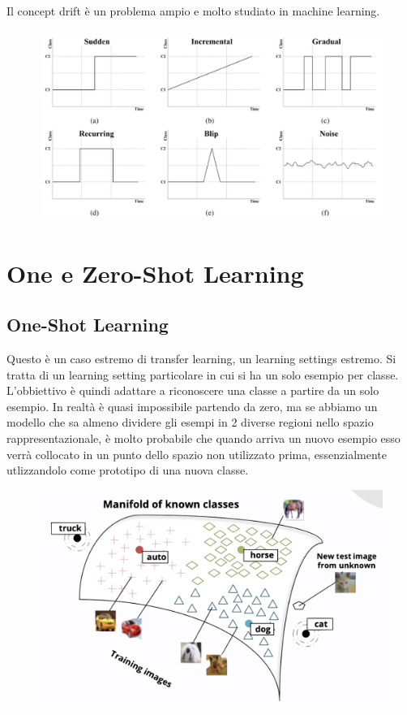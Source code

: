 Il concept drift è un problema ampio e molto studiato in machine learning.
\begin{figure}[!h]
  \includegraphics[scale=.5]{images/representation_learning/concept_drift.png}
  \centering
\end{figure}
\newpage
\section{One e Zero-Shot Learning}
\subsection{One-Shot Learning}
Questo è un caso estremo di transfer learning, un learning settings estremo. Si tratta di un learning setting 
particolare in cui si ha un solo esempio per classe. L'obbiettivo è quindi adattare a riconoscere una classe 
a partire da un solo esempio. In realtà è quasi impossibile partendo da zero, ma se abbiamo un modello che sa
almeno dividere gli esempi in 2 diverse regioni nello spazio rappresentazionale, è molto probabile che quando
arriva un nuovo esempio esso verrà collocato in un punto dello spazio non utilizzato prima, essenzialmente 
utlizzandolo come prototipo di una nuova classe.
\begin{figure}[!h]
  \includegraphics[scale=.5]{images/representation_learning/one_shot.png}
  \centering
\end{figure}
